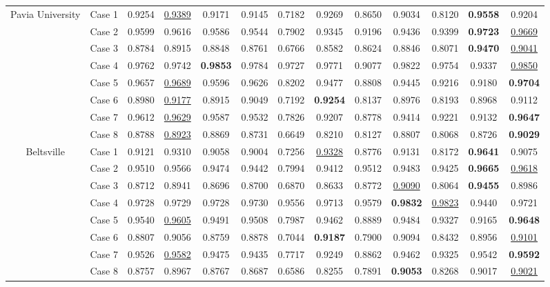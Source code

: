 \begin{table*}[t]
\begin{center}
{\begin{tabular}{cc ccccccccccc}
				\multirow{8}{*}{Pavia University} 
				& Case 1 & 
				0.9254 & \underline{0.9389} & 0.9171 & 0.9145 & 0.7182 & 0.9269 & 0.8650 & 0.9034 & 0.8120 & \textbf{0.9558} & 0.9204 \\ 
				& Case 2 & 
				0.9599 & 0.9616 & 0.9586 & 0.9544 & 0.7902 & 0.9345 & 0.9196 & 0.9436 & 0.9399 & \textbf{0.9723} & \underline{0.9669} \\ 
				& Case 3 & 
				0.8784 & 0.8915 & 0.8848 & 0.8761 & 0.6766 & 0.8582 & 0.8624 & 0.8846 & 0.8071 & \textbf{0.9470} & \underline{0.9041} \\ 
				& Case 4 & 
				0.9762 & 0.9742 & \textbf{0.9853} & 0.9784 & 0.9727 & 0.9771 & 0.9077 & 0.9822 & 0.9754 & 0.9337 & \underline{0.9850} \\ 
				& Case 5 & 
				0.9657 & \underline{0.9689} & 0.9596 & 0.9626 & 0.8202 & 0.9477 & 0.8808 & 0.9445 & 0.9216 & 0.9180 & \textbf{0.9704} \\ 
				& Case 6 & 
				0.8980 & \underline{0.9177} & 0.8915 & 0.9049 & 0.7192 & \textbf{0.9254} & 0.8137 & 0.8976 & 0.8193 & 0.8968 & 0.9112 \\ 
				& Case 7 & 
				0.9612 & \underline{0.9629} & 0.9587 & 0.9532 & 0.7826 & 0.9207 & 0.8778 & 0.9414 & 0.9221 & 0.9132 & \textbf{0.9647} \\ 
				& Case 8 & 
				0.8788 & \underline{0.8923} & 0.8869 & 0.8731 & 0.6649 & 0.8210 & 0.8127 & 0.8807 & 0.8068 & 0.8726 & \textbf{0.9029} \\ 
				
				\cmidrule(lr){1-13} 
				
				\multirow{8}{*}{Beltsville} 
				& Case 1 & 
				0.9121 & 0.9310 & 0.9058 & 0.9004 & 0.7256 & \underline{0.9328} & 0.8776 & 0.9131 & 0.8172 & \textbf{0.9641} & 0.9075 \\ 
				& Case 2 & 
				0.9510 & 0.9566 & 0.9474 & 0.9442 & 0.7994 & 0.9412 & 0.9512 & 0.9483 & 0.9425 & \textbf{0.9665} & \underline{0.9618} \\ 
				& Case 3 & 
				0.8712 & 0.8941 & 0.8696 & 0.8700 & 0.6870 & 0.8633 & 0.8772 & \underline{0.9090} & 0.8064 & \textbf{0.9455} & 0.8986 \\ 
				& Case 4 & 
				0.9728 & 0.9729 & 0.9728 & 0.9730 & 0.9556 & 0.9713 & 0.9579 & \textbf{0.9832} & \underline{0.9823} & 0.9440 & 0.9721 \\ 
				& Case 5 & 
				0.9540 & \underline{0.9605} & 0.9491 & 0.9508 & 0.7987 & 0.9462 & 0.8889 & 0.9484 & 0.9327 & 0.9165 & \textbf{0.9648} \\ 
				& Case 6 & 
				0.8807 & 0.9056 & 0.8759 & 0.8878 & 0.7044 & \textbf{0.9187} & 0.7900 & 0.9094 & 0.8432 & 0.8956 & \underline{0.9101} \\ 
				& Case 7 & 
				0.9526 & \underline{0.9582} & 0.9475 & 0.9435 & 0.7717 & 0.9249 & 0.8862 & 0.9462 & 0.9325 & 0.9542 & \textbf{0.9592} \\ 
				& Case 8 & 
				0.8757 & 0.8967 & 0.8767 & 0.8687 & 0.6586 & 0.8255 & 0.7891 & \textbf{0.9053} & 0.8268 & 0.9017 & \underline{0.9021} \\ 
				

\end{tabular}}
\end{center}
\end{table*}
